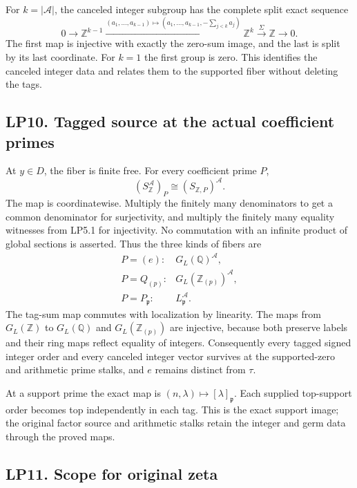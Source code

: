 For \(k=|\mathcal A|\), the canceled integer subgroup has the complete
split exact sequence \[
0\to\mathbb Z^{k-1}
\xrightarrow{(a_1,\ldots,a_{k-1})\mapsto
(a_1,\ldots,a_{k-1},-\sum_{j<k}a_j)}
\mathbb Z^k\xrightarrow{\Sigma}\mathbb Z\to0.
\tag{LP9.4}
\] The first map is injective with exactly the zero-sum image, and the
last is split by its last coordinate. For \(k=1\) the first group is
zero. This identifies the canceled integer data and relates them to the
supported fiber without deleting the tags.

\subsection{LP10. Tagged source at the actual coefficient
primes}\label{lp10.-tagged-source-at-the-actual-coefficient-primes}

At \(y\in D\), the fiber is finite free. For every coefficient prime
\(P\), \[
(S_{\mathbb Z}^{\mathcal A})_P\cong(S_{\mathbb Z,P})^{\mathcal A}.
\tag{LP10.1}
\] The map is coordinatewise. Multiply the finitely many denominators to
get a common denominator for surjectivity, and multiply the finitely
many equality witnesses from LP5.1 for injectivity. No commutation with
an infinite product of global sections is asserted. Thus the three kinds
of fibers are \[
\begin{array}{ll}
P=(e):&G_L(\mathbb Q)^{\mathcal A},\\
P=Q_{(p)}:&G_L(\mathbb Z_{(p)})^{\mathcal A},\\
P=P_{\mathfrak p}:&L_{\mathfrak p}^{\mathcal A}.
\end{array}\tag{LP10.2}
\] The tag-sum map commutes with localization by linearity. The maps
from \(G_L(\mathbb Z)\) to \(G_L(\mathbb Q)\) and
\(G_L(\mathbb Z_{(p)})\) are injective, because both preserve labels and
their ring maps reflect equality of integers. Consequently every tagged
signed integer order and every canceled integer vector survives at the
supported-zero and arithmetic prime stalks, and \(e\) remains distinct
from \(\tau\).

At a support prime the exact map is
\((n,\lambda)\mapsto[\lambda]_{\mathfrak p}\). Each supplied top-support
order becomes top independently in each tag. This is the exact support
image; the original factor source and arithmetic stalks retain the
integer and germ data through the proved maps.

\subsection{LP11. Scope for original
zeta}\label{lp11.-scope-for-original-zeta}

